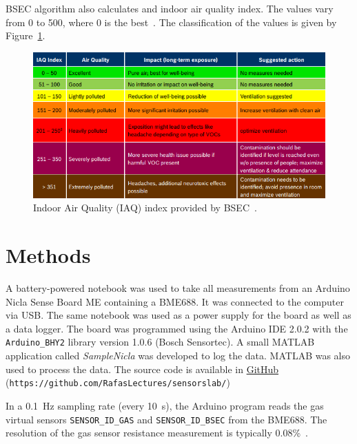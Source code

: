 \documentclass[DIV=14]{scrartcl}
\begin{document}
    BSEC algorithm also calculates and indoor air quality index.
    The values vary from 0 to 500, where 0 is the best~\cite{BME688}.
    The classification of the values is given by Figure~\ref{fig:iaqTable}.

    \begin{figure}[!h]
        \centering
        \includegraphics[width=.8\textwidth]{figures/iaqBme688}
        \caption{Indoor Air Quality (IAQ) index provided by BSEC~\cite{BME688}.}
        \label{fig:iaqTable}
    \end{figure}

    \section{Methods}\label{sec:methods}
    A battery-powered notebook was used to take all measurements from an Arduino Nicla Sense Board ME containing a BME688.
    It was connected to the computer via USB.
    The same notebook was used as a power supply for the board as well as a data logger.
    The board was programmed using the Arduino IDE 2.0.2 with the \texttt{Arduino\_BHY2} library version 1.0.6 (Bosch Sensortec).
    A small MATLAB application called \textit{SampleNicla} was developed to log the data.
    MATLAB was also used to process the data.
    The source code is available in \href{https://github.com/RafasLectures/sensorslab/blob/main/SampleNicla.mlapp}{GitHub}
    (\texttt{https://github.com/RafasLectures/sensorslab/})

    In a \SI{0.1}{\hertz} sampling rate (every \SI{10}{\second}), the Arduino program reads the gas
    virtual sensors \texttt{SENSOR\_ID\_GAS} and \texttt{SENSOR\_ID\_BSEC} from the BME688.
    The resolution of the gas sensor resistance measurement is typically 0.08\%~\cite{BME688}.

\end{document}
